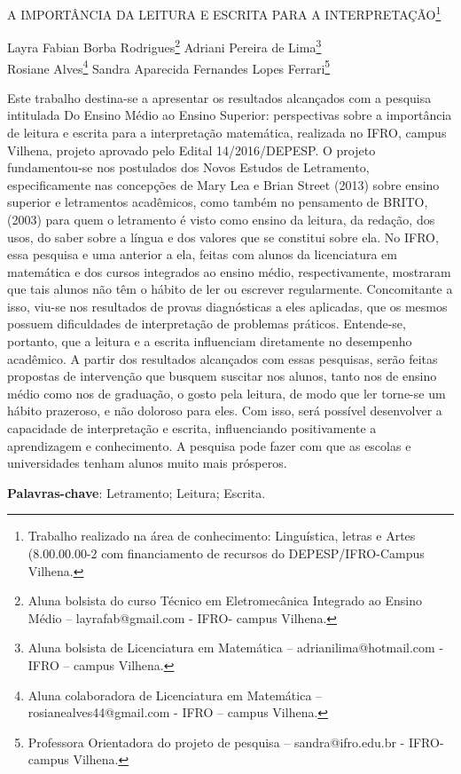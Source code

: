 \documentclass[article,12pt,onesidea,4paper,english,brazil]{abntex2}
\begin{document}
	
	
	\frenchspacing 
	
	\begin{center}
		\LARGE A IMPORTÂNCIA DA LEITURA E ESCRITA PARA A INTERPRETAÇÃO\footnote{Trabalho realizado na área de conhecimento: Linguística, letras e Artes (8.00.00.00-2 com
			financiamento de recursos do DEPESP/IFRO-Campus Vilhena.}
		
		\normalsize
		Layra Fabian Borba Rodrigues\footnote{Aluna bolsista do curso Técnico em Eletromecânica Integrado ao Ensino Médio –
			layrafab@gmail.com - IFRO- campus Vilhena.} 
		Adriani Pereira de Lima\footnote{Aluna bolsista de Licenciatura em Matemática – adrianilima@hotmail.com - IFRO – campus Vilhena.} \\
		Rosiane Alves\footnote{Aluna colaboradora de Licenciatura em Matemática – rosianealves44@gmail.com - IFRO – campus
			Vilhena.} 
		Sandra Aparecida Fernandes Lopes Ferrari\footnote{Professora Orientadora do projeto de pesquisa – sandra@ifro.edu.br - IFRO- campus Vilhena.} 
	\end{center}
	
	\noindent Este trabalho destina-se a apresentar os resultados alcançados com a pesquisa
	intitulada Do Ensino Médio ao Ensino Superior: perspectivas sobre a importância de
	leitura e escrita para a interpretação matemática, realizada no IFRO, campus
	Vilhena, projeto aprovado pelo Edital 14/2016/DEPESP. O projeto fundamentou-se
	nos postulados dos Novos Estudos de Letramento, especificamente nas concepções
	de Mary Lea e Brian Street (2013) sobre ensino superior e letramentos acadêmicos,
	como também no pensamento de BRITO, (2003) para quem o letramento é visto
	como ensino da leitura, da redação, dos usos, do saber sobre a língua e dos valores
	que se constitui sobre ela. No IFRO, essa pesquisa e uma anterior a ela, feitas com
	alunos da licenciatura em matemática e dos cursos integrados ao ensino médio,
	respectivamente, mostraram que tais alunos não têm o hábito de ler ou escrever
	regularmente. Concomitante a isso, viu-se nos resultados de provas diagnósticas a
	eles aplicadas, que os mesmos possuem dificuldades de interpretação de problemas
	práticos. Entende-se, portanto, que a leitura e a escrita influenciam diretamente no
	desempenho acadêmico. A partir dos resultados alcançados com essas pesquisas,
	serão feitas propostas de intervenção que busquem suscitar nos alunos, tanto nos
	de ensino médio como nos de graduação, o gosto pela leitura, de modo que ler
	torne-se um hábito prazeroso, e não doloroso para eles. Com isso, será possível
	desenvolver a capacidade de interpretação e escrita, influenciando positivamente a
	aprendizagem e conhecimento. A pesquisa pode fazer com que as escolas e
	universidades tenham alunos muito mais prósperos.
	
	\vspace{\onelineskip}
	
	\noindent
	\textbf{Palavras-chave}: Letramento; Leitura; Escrita.
	
\end{document}
